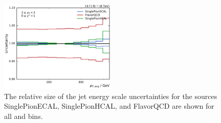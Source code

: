 \begin{figure}[htbp]
    \includegraphics[width=0.49\textwidth]{figures/measurement/jec_relunc_1_yb2ys0.pdf}
    \caption[Split-up of JEC uncertainty sources: Part II] {The relative size of the jet energy scale
             uncertainties for the sources SinglePionECAL, SinglePionHCAL, and
             FlavorQCD are shown for all \ystar and \yboost bins.}
    \label{fig:jec_relunc_1}
\end{figure}

